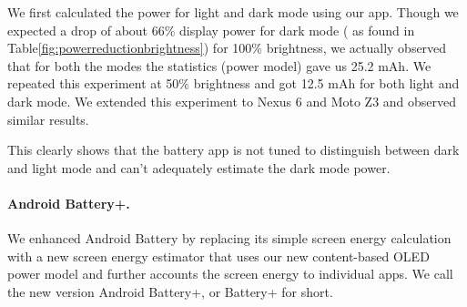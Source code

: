 We first calculated the power for light and dark mode using our app.
Though we expected a drop of about 66\% display power for dark mode
( as found in Table\ref{fig:powerreductionbrightness}) for 100\% brightness,
we actually observed that for both the modes the statistics (power model) gave us 25.2 mAh.
We repeated this experiment at 50\% brightness and got 12.5 mAh for both light and dark mode.
We extended this experiment to Nexus 6 and Moto Z3 and observed similar results.

This clearly shows that the battery app is not tuned to distinguish between dark and light mode
and can't adequately estimate the dark mode power.
\fi

\paragraph{Android Battery+.}
We enhanced Android Battery by replacing its
simple screen energy calculation
with a new screen energy estimator that uses our new content-based OLED power model
and further accounts the screen energy to individual apps.
We call the new version Android Battery+, or Battery+ for short.

\fi


